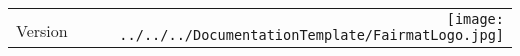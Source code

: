 \documentclass{article}
\begin{document}
\thispagestyle{plain}
\begin{center}
	\begin{tabular}{l|r}
		{\huge \pluginName} & \multirow{2}{*}{\texttt{[image: ../../../DocumentationTemplate/FairmatLogo.jpg]}}\\
		{\huge Version \pluginVersion} &
	\end{tabular}
\end{center}
\vspace{2cm}
\end{document}
